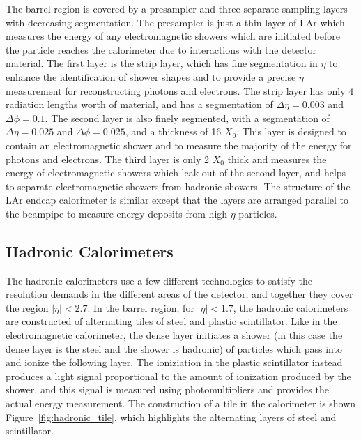 The barrel region is covered by a presampler and three separate sampling layers with decreasing segmentation.
The presampler is just a thin layer of \acl{LAr} which measures the energy of any electromagnetic showers which are initiated before the particle reaches the calorimeter due to interactions with the detector material.
The first layer is the strip layer, which has fine segmentation in $\eta$ to enhance the identification of shower shapes and to provide a precise $\eta$ measurement for reconstructing photons and electrons.
The strip layer has only 4 radiation lengths worth of material, and has a segmentation of $\Delta\eta = 0.003$ and $\Delta\phi = 0.1$. 
The second layer is also finely segmented, with a segmentation of $\Delta\eta = 0.025$ and $\Delta\phi = 0.025$, and a thickness of 16 $X_0$.
This layer is designed to contain an electromagnetic shower and to measure the majority of the energy for photons and electrons.
The third layer is only 2 $X_0$ thick and measures the energy of electromagnetic showers which leak out of the second layer, and helps to separate electromagnetic showers from hadronic showers. 
The structure of the \ac{LAr} endcap calorimeter is similar except that the layers are arranged parallel to the beampipe to measure energy deposits from high $\eta$ particles.


\subsection{Hadronic Calorimeters}

The hadronic calorimeters use a few different technologies to satisfy the resolution demands in the different areas of the detector, and together they cover the region $|\eta| < 2.7$.
In the barrel region, for $|\eta| < 1.7$, the hadronic calorimeters are constructed of alternating tiles of steel and plastic scintillator. 
Like in the electromagnetic calorimeter, the dense layer initiates a shower (in this case the dense layer is the steel and the shower is hadronic) of particles which pass into and ionize the following layer.
The ioniziation in the plastic scintillator instead produces a light signal proportional to the amount of ionization produced by the shower, and this signal is measured using photomultipliers and provides the actual energy measurement.
The construction of a tile in the calorimeter is shown Figure~\ref{fig:hadronic_tile}, which highlights the alternating layers of steel and scintillator.

